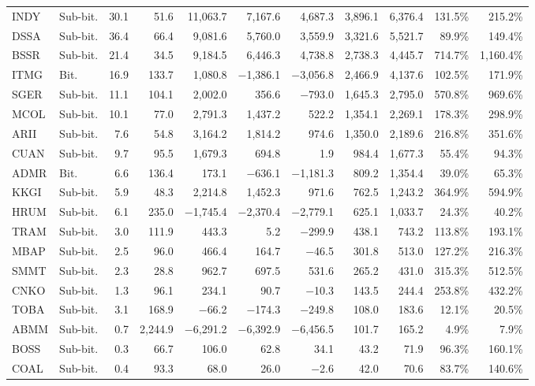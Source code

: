 \begin{landscape}
\begin{longtable}{llrrrrrrrrr}
INDY & Sub-bit. & 30.1 & 51.6 & 11,063.7 & 7,167.6 & 4,687.3 & 3,896.1 & 6,376.4 & 131.5\% & 215.2\% \\
DSSA & Sub-bit. & 36.4 & 66.4 & 9,081.6 & 5,760.0 & 3,559.9 & 3,321.6 & 5,521.7 & 89.9\% & 149.4\% \\
BSSR & Sub-bit. & 21.4 & 34.5 & 9,184.5 & 6,446.3 & 4,738.8 & 2,738.3 & 4,445.7 & 714.7\% & 1,160.4\% \\
ITMG & Bit. & 16.9 & 133.7 & 1,080.8 & $-$1,386.1 & $-$3,056.8 & 2,466.9 & 4,137.6 & 102.5\% & 171.9\% \\
SGER & Sub-bit. & 11.1 & 104.1 & 2,002.0 & 356.6 & $-$793.0 & 1,645.3 & 2,795.0 & 570.8\% & 969.6\% \\
MCOL & Sub-bit. & 10.1 & 77.0 & 2,791.3 & 1,437.2 & 522.2 & 1,354.1 & 2,269.1 & 178.3\% & 298.9\% \\
ARII & Sub-bit. & 7.6 & 54.8 & 3,164.2 & 1,814.2 & 974.6 & 1,350.0 & 2,189.6 & 216.8\% & 351.6\% \\
CUAN & Sub-bit. & 9.7 & 95.5 & 1,679.3 & 694.8 & 1.9 & 984.4 & 1,677.3 & 55.4\% & 94.3\% \\
ADMR & Bit. & 6.6 & 136.4 & 173.1 & $-$636.1 & $-$1,181.3 & 809.2 & 1,354.4 & 39.0\% & 65.3\% \\
KKGI & Sub-bit. & 5.9 & 48.3 & 2,214.8 & 1,452.3 & 971.6 & 762.5 & 1,243.2 & 364.9\% & 594.9\% \\
HRUM & Sub-bit. & 6.1 & 235.0 & $-$1,745.4 & $-$2,370.4 & $-$2,779.1 & 625.1 & 1,033.7 & 24.3\% & 40.2\% \\
TRAM & Sub-bit. & 3.0 & 111.9 & 443.3 & 5.2 & $-$299.9 & 438.1 & 743.2 & 113.8\% & 193.1\% \\
MBAP & Sub-bit. & 2.5 & 96.0 & 466.4 & 164.7 & $-$46.5 & 301.8 & 513.0 & 127.2\% & 216.3\% \\
SMMT & Sub-bit. & 2.3 & 28.8 & 962.7 & 697.5 & 531.6 & 265.2 & 431.0 & 315.3\% & 512.5\% \\
CNKO & Sub-bit. & 1.3 & 96.1 & 234.1 & 90.7 & $-$10.3 & 143.5 & 244.4 & 253.8\% & 432.2\% \\
TOBA & Sub-bit. & 3.1 & 168.9 & $-$66.2 & $-$174.3 & $-$249.8 & 108.0 & 183.6 & 12.1\% & 20.5\% \\
ABMM & Sub-bit. & 0.7 & 2,244.9 & $-$6,291.2 & $-$6,392.9 & $-$6,456.5 & 101.7 & 165.2 & 4.9\% & 7.9\% \\
BOSS & Sub-bit. & 0.3 & 66.7 & 106.0 & 62.8 & 34.1 & 43.2 & 71.9 & 96.3\% & 160.1\% \\
COAL & Sub-bit. & 0.4 & 93.3 & 68.0 & 26.0 & $-$2.6 & 42.0 & 70.6 & 83.7\% & 140.6\% \\

\end{longtable}
\end{landscape}

